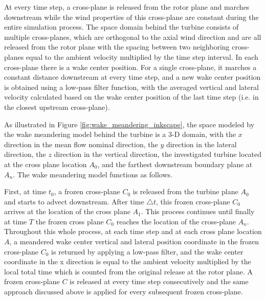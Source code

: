 \documentclass{umthesis}
\begin{document}
At every time step, a cross-plane is released from the rotor plane and marches downstream while the wind properties of this cross-plane are constant during the entire simulation process. The space domain behind the turbine consists of multiple cross-planes, which are orthogonal to the axial wind direction and are all released from the rotor plane with the spacing between two neighboring cross-planes equal to the ambient velocity multiplied by the time step interval. In each cross-plane there is a wake center position. For a single cross-plane, it marches a constant distance downstream at every time step, and a new wake center position is obtained using a low-pass filter function, with the averaged vertical and lateral velocity calculated based on the wake center position of the last time step (i.e. in the closest upstream cross-plane).

As illustrated in Figure \ref{fig:wake_meandering_inkscape}, the space modeled by the wake meandering model behind the turbine is a 3-D domain, with the $x$ direction in the mean flow nominal direction, the $y$ direction in the lateral direction, the $z$ direction in the vertical direction, the investigated turbine located at the cross plane location $A_0$, and the farthest downstream boundary plane at $A_n$. The wake meandering model functions as follows.

First, at time $t_0$, a frozen cross-plane $C_0$ is released from the turbine plane $A_0$ and starts to advect downstream. After time $\triangle t$, this frozen cross-plane $C_0$ arrives at the location of the cross plane $A_1$. This process continues until finally at time $T$ the frozen cross plane $C_0$ reaches the location of the cross-plane $A_n$. Throughout this whole process, at each time step and at each cross plane location $A$, a meandered wake center vertical and lateral position coordinate in the frozen cross-plane $C_0$ is returned by applying a low-pass filter, and the wake center coordinate in the x direction is equal to the ambient velocity multiplied by the local total time which is counted from the original release at the rotor plane. A frozen cross-plane $C$ is released at every time step consecutively and the same approach discussed above is applied for every subsequent frozen cross-plane.
\end{document}
